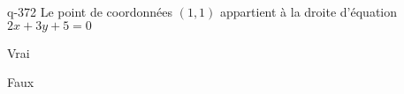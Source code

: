 \begin{truefalse}{q-372}
Le point de coordonnées $(1,1)$ appartient à la droite d'équation $2x+3y+5=0$
\item Vrai
\item* Faux
\end{truefalse}

